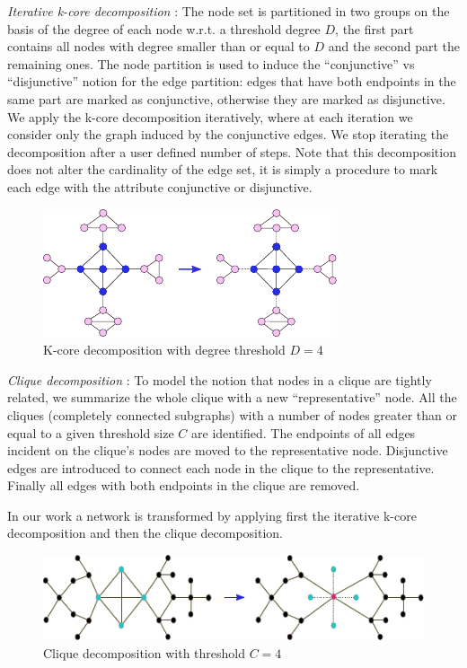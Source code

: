 \documentclass[review]{elsarticle}
\begin{document}
\textit{Iterative k-core decomposition} \cite{alvarez2005k}: The node set is partitioned in two groups on the basis of the degree of each node w.r.t. a threshold degree $D$, the first part contains all nodes with degree smaller than or equal to $D$ and the second part the remaining ones. The node partition is used to induce the ``conjunctive'' vs ``disjunctive'' notion for the edge partition: edges that have both endpoints in the same part are marked as conjunctive, otherwise they are marked as disjunctive. We apply the k-core decomposition iteratively, where at each iteration we consider only the graph induced by the conjunctive edges. We stop iterating the decomposition after a user defined number of steps. Note that this decomposition does not alter the cardinality of the edge set, it is simply a procedure to mark each edge with the attribute conjunctive or disjunctive.  

\begin{figure}
\centering
\includegraphics[width=.9\textwidth]{k_core}
\caption{K-core decomposition with degree threshold $D = 4$}
\label{fig:kcore-decomposition}
\end{figure}

\textit{Clique decomposition} \cite{tarjan1985decomposition}: To model the notion that nodes in a clique are tightly related, we summarize the whole clique with a new ``representative'' node. All the cliques (completely connected subgraphs) with a number of nodes greater than or equal to a given threshold size $C$ are identified. The endpoints of all edges incident on the clique's nodes are moved to the representative node. Disjunctive edges are introduced to connect each node in the clique to the representative. Finally all edges with both endpoints in the clique are removed.

In our work a network is transformed by applying first the iterative k-core decomposition and then the clique decomposition.

\begin{figure}
\centering
\includegraphics[width=.9\textwidth]{clique}
\caption{Clique decomposition with threshold $C = 4$}
\label{fig:clique-decomposition}
\end{figure}
\end{document}
